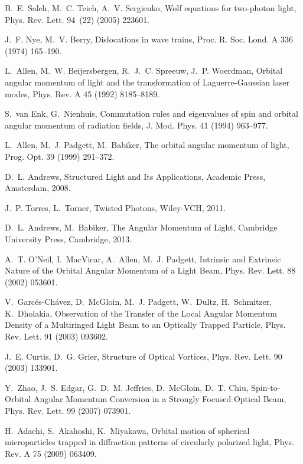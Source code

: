\documentclass[1p,sort&compress]{elsarticle}
\numberwithin{equation}{section}
\begin{document}
\begin{thebibliography}{999}
B.~E. Saleh, M.~C. Teich, A.~V. Sergienko, {Wolf equations for two-photon
  light}, Phys. Rev. Lett. 94~(22) (2005) 223601.

J.~F. Nye, M.~V. Berry, {Dislocations in wave trains}, Proc. R. Soc. Lond. A
  336 (1974) 165--190.

L.~Allen, M.~W. Beijersbergen, R.~J.~C. Spreeuw, J.~P. Woerdman, {Orbital
  angular momentum of light and the transformation of Laguerre-Gaussian laser
  modes}, Phys. Rev. A 45 (1992) 8185--8189.

S.~van Enk, G.~Nienhuis, {Commutation rules and eigenvalues of spin and orbital
  angular momentum of radiation fields}, J. Mod. Phys. 41 (1994) 963--977.

L.~Allen, M.~J. Padgett, M.~Babiker, {The orbital angular momentum of light},
  Prog. Opt. 39 (1999) 291--372.

D.~L. Andrews, Structured Light and Its Applications, Academic Press,
  Amsterdam, 2008.

J.~P. Torres, L.~Torner, {Twisted Photons}, Wiley-VCH, 2011.

D.~L. Andrews, M.~Babiker, The Angular Momentum of Light, Cambridge University
  Press, Cambridge, 2013.

A.~T. O'Neil, I.~MacVicar, A.~Allen, M.~J. Padgett, {Intrinsic and Extrinsic
  Nature of the Orbital Angular Momentum of a Light Beam}, Phys. Rev. Lett. 88
  (2002) 053601.

V.~Garc\'es-Ch\'avez, D.~McGloin, M.~J. Padgett, W.~Dultz, H.~Schmitzer,
  K.~Dholakia, {Observation of the Transfer of the Local Angular Momentum
  Density of a Multiringed Light Beam to an Optically Trapped Particle}, Phys.
  Rev. Lett. 91 (2003) 093602.

J.~E. Curtis, D.~G. Grier, {Structure of Optical Vortices}, Phys. Rev. Lett. 90
  (2003) 133901.

Y.~Zhao, J.~S. Edgar, G.~D.~M. Jeffries, D.~McGloin, D.~T. Chiu,
  {Spin-to-Orbital Angular Momentum Conversion in a Strongly Focused Optical
  Beam}, Phys. Rev. Lett. 99 (2007) 073901.

H.~Adachi, S.~Akahoshi, K.~Miyakawa, {Orbital motion of spherical
  microparticles trapped in diffraction patterns of circularly polarized
  light}, Phys. Rev. A 75 (2009) 063409.


\end{thebibliography}
\end{document}
